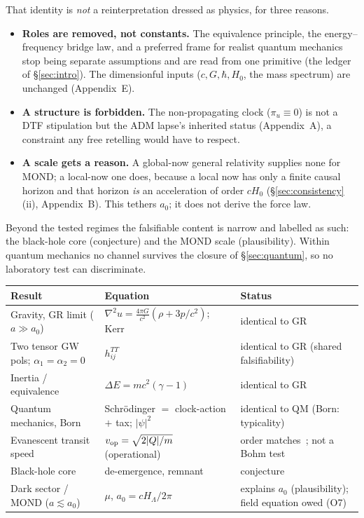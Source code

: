 \documentclass[11pt]{article}
\begin{document}
That identity is \emph{not} a reinterpretation dressed as physics, for three reasons.
\begin{itemize}[leftmargin=1.4em,itemsep=2.5pt,topsep=3pt]
\item \textbf{Roles are removed, not constants.} The equivalence principle, the energy--frequency bridge law,
  and a preferred frame for realist quantum mechanics stop being separate assumptions and are read from one
  primitive (the ledger of \S\ref{sec:intro}). The dimensionful inputs ($c,G,\hbar,H_0$, the mass spectrum) are unchanged
  (Appendix~E).
\item \textbf{A structure is forbidden.} The non-propagating clock ($\pi_u\equiv0$) is not a DTF stipulation
  but the ADM lapse's inherited status (Appendix~A), a constraint any free retelling would have to respect.
\item \textbf{A scale gets a reason.} A global-now general relativity supplies none for MOND; a local-now one
  does, because a local now has only a finite causal horizon and that horizon \emph{is} an acceleration of
  order $cH_0$ (\S\ref{sec:consistency}(ii), Appendix~B). This tethers $a_0$; it does not derive the force law.
\end{itemize}
\noindent Beyond the tested regimes the falsifiable content is narrow and labelled as such: the black-hole
core (conjecture) and the MOND scale (plausibility). Within quantum mechanics no channel survives the closure
of \S\ref{sec:quantum}, so no laboratory test can discriminate.

\begin{center}\small
\renewcommand{\arraystretch}{1.25}
\begin{tabular}{@{}>{\raggedright}p{} >{\raggedright}p{} p{}@{}}
\toprule
\textbf{Result} & \textbf{Equation} & \textbf{Status}\\\midrule
Gravity, GR limit ($a\gg a_0$) & $\nabla^2u=\tfrac{4\pi G}{c^2}(\rho+3p/c^2)$; Kerr & identical to GR\\
Two tensor GW pols; $\alpha_1{=}\alpha_2{=}0$ & $h_{ij}^{TT}$ & identical to GR (shared falsifiability)\\
Inertia / equivalence & $\Delta E=mc^2(\gamma-1)$ & identical to GR\\
Quantum mechanics, Born & Schr\"odinger $=$ clock-action $+$ tax; $|\psi|^2$ & identical to QM (Born: typicality)\\
Evanescent transit speed & $v_{\rm op}=\sqrt{2|Q|/m}$ (operational) & order matches~\cite{Sharoglazova2025}; not a Bohm test~\cite{DrezetLazaroviciNabet2026}\\
Black-hole core & de-emergence, remnant & conjecture\\
Dark sector / MOND ($a\lesssim a_0$) & $\mu$, $a_0=cH_\Lambda/2\pi$ & explains $a_0$ (plausibility); field equation owed (O7)\\
\bottomrule
\end{tabular}
\end{center}
\end{document}
